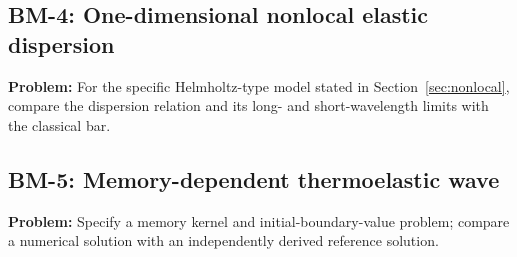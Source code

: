 \subsection{BM-4: One-dimensional nonlocal elastic dispersion}

\textbf{Problem:} For the specific Helmholtz-type model stated in Section~\ref{sec:nonlocal}, compare the dispersion relation and its long- and short-wavelength limits with the classical bar.

\subsection{BM-5: Memory-dependent thermoelastic wave}

\textbf{Problem:} Specify a memory kernel and initial-boundary-value problem; compare a numerical solution with an independently derived reference solution.
